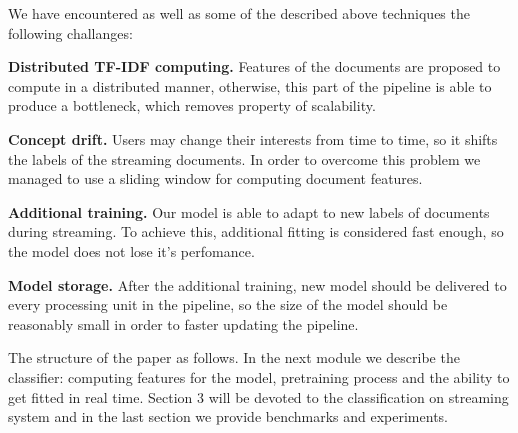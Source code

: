 We have encountered as well as some of the described above techniques the following challanges:

\textbf{Distributed TF-IDF computing.} Features of the documents are proposed to compute in a distributed manner, otherwise, this part of the pipeline is able to produce a bottleneck, which removes property of scalability.

\textbf{Concept drift.} Users may change their interests from time to time, so it shifts the labels of the streaming documents. In order to overcome this problem we managed to use a sliding window for computing document features.

\textbf{Additional training.} Our model is able to adapt to new labels of documents during streaming. To achieve this, additional fitting is considered fast enough, so the model does not lose it's perfomance.

\textbf{Model storage.} After the additional training, new model should be delivered to every processing unit in the pipeline, so the size of the model should be reasonably small in order to faster updating the pipeline.

The structure of the paper as follows. In the next module we describe the classifier: computing features for the model, pretraining process and the ability to get fitted in real time. Section 3 will be devoted to the classification on streaming system and in the last section we provide benchmarks and experiments.
    